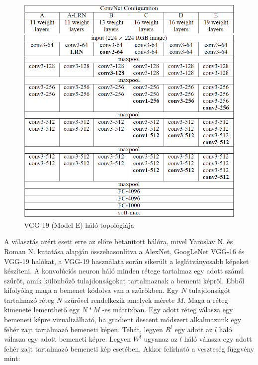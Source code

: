 \documentclass[12pt, a4paper, oneside]{book}
\theoremstyle{tetel}
\begin{document}
\begin{figure}[h]
	\begin{center}
		\includegraphics[scale=0.7]{VGG19.png}
		\caption{VGG-19 (Model E) háló topológiája\cite{29}}
		\label{vgg_19}
	\end{center}
\end{figure}

A választás azért esett erre az előre betanított hálóra, mivel Yaroslav N. és Roman N. kutatása alapján\cite{16} összehasonlítva a AlexNet, GoogLeNet VGG-16 és VGG-19 halókat, a VGG-19 használata során sikerült a leglátványosabb képeket készíteni.
\newline
\indent
A konvolúciós neuron háló minden rétege tartalmaz egy adott számú szűrőt, amik különbőző tulajdonságokat tartalmaznak a bementi képről. Ebből kifolyólag maga a bemenet kódolva van a szűrőkben. Egy \(N\) tulajdonságót tartalmazó réteg \(N\) szűrővel rendelkezik amelyek mérete \(M\). Maga a réteg kimenete lementhető egy \(N * M\) -es mátrixban. Egy adott réteg válasza egy bemeneti képre vizualizálható, ha gradient descent módszert alkalmazunk egy fehér zajt tartalmazó bemeneti képen. Tehát, legyen \(R^l\) egy adott az \(l\) haló válasza egy adott bemeneti képre. Legyen \(W^l\) ugyanaz az \(l\) háló válasza egy adott fehér zajt tartalmazó bemeneti kép esetében. Akkor felírható a veszteség függvény mint:
\end{document}
